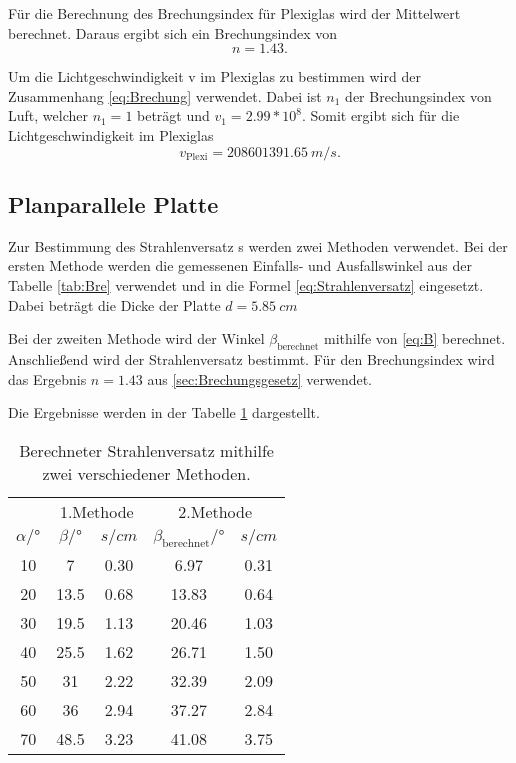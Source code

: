 \noindent Für die Berechnung des Brechungsindex für Plexiglas wird der Mittelwert berechnet.
Daraus ergibt sich ein Brechungsindex von
\begin{equation*}
  n = 1.43.
\end{equation*} 

\noindent Um die Lichtgeschwindigkeit v im Plexiglas zu bestimmen wird der Zusammenhang \ref{eq:Brechung} verwendet.
Dabei ist $n_1$ der Brechungsindex von Luft, welcher $n_1 = 1$ beträgt und $v_1 = 2.99*10^8$.
Somit ergibt sich für die Lichtgeschwindigkeit im Plexiglas 
\begin{equation*}
  v_\text{Plexi} = \qty{208601391.65}{m/s} .
\end{equation*}

\subsection{Planparallele Platte}
Zur Bestimmung des Strahlenversatz s werden zwei Methoden verwendet.
Bei der ersten Methode werden die gemessenen Einfalls- und Ausfallswinkel aus der Tabelle \ref{tab:Bre} verwendet und 
in die Formel \ref{eq:Strahlenversatz} eingesetzt.
Dabei beträgt die Dicke der Platte $d = \qty{5.85}{cm}$

Bei der zweiten Methode wird der Winkel $\beta_\text{berechnet}$ mithilfe von \ref{eq:B} berechnet.
Anschließend wird der Strahlenversatz bestimmt.
Für den Brechungsindex wird das Ergebnis $n = 1.43$ aus \ref{sec:Brechungsgesetz} verwendet.

Die Ergebnisse werden in der Tabelle \ref{tab:Plan} dargestellt.
\begin{table}[H]
  \centering
  \caption{Berechneter Strahlenversatz mithilfe zwei verschiedener Methoden.}
  \label{tab:Plan}
  \begin{tabular}{c c c c c}
    \toprule
  & \multicolumn{2}{c}{1.Methode} & \multicolumn{2}{c}{2.Methode} \\
\cmidrule(lr){2-3}\cmidrule(lr){4-5}
    $\alpha / °$ & $\beta  /° $ & $s /cm$ &  $\beta_\text{berechnet}  /°$ & $s /cm$ \\
    \midrule
    10 & 7    & 0.30 & 6.97 & 0.31\\  
    20 & 13.5 & 0.68 & 13.83 & 0.64\\    
    30 & 19.5 & 1.13 & 20.46 & 1.03\\  
    40 & 25.5 & 1.62 & 26.71 & 1.50\\  
    50 & 31   & 2.22 & 32.39 & 2.09\\  
    60 & 36   & 2.94 & 37.27 & 2.84\\  
    70 & 48.5 & 3.23 & 41.08 & 3.75\\  
    \bottomrule
  \end{tabular}
\end{table}

